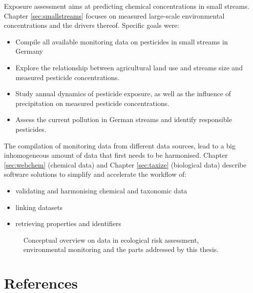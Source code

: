 \noindent Exposure assessment aims at predicting chemical concentrations in small streams. 
Chapter \ref{sec:smallstreams} focuses on measured large-scale environmental concentrations and the drivers thereof. 
Specific goals were:
\begin{itemize}
	\item Compile all available monitoring data on pesticides in small streams in Germany
	\item Explore the relationship between agricultural land use and streams size and measured pesticide concentrations.
	\item Study annual dynamics of pesticide exposure, as well as the influence of precipitation on measured pesticide concentrations.
	\item Assess the current pollution in German streams and identify responsible pesticides.
\end{itemize}

\noindent
The compilation of monitoring data from different data sources, lead to a big inhomogeneous amount of data that first needs to be harmonised.
Chapter \ref{sec:webchem} (chemical data) and Chapter \ref{sec:taxize} (biological data) describe software solutions to simplify and accelerate the workflow of:

\begin{itemize}
	\item validating and harmonising chemical and taxonomic data
	\item linking datasets
	\item retrieving properties and identifiers
\end{itemize}


\begin{figure}
	\resizebox{1\textwidth}{!}{%
		
	}
	\caption[Conceptual overview of the topics addressed by this thesis]{Conceptual overview on data in ecological risk assessment, environmental monitoring and the parts addressed by this thesis.}
	\label{fig:intro:overview}
\end{figure}





\newpage
\section{References}
\printbibliography[heading=none, sorting=nyt]
